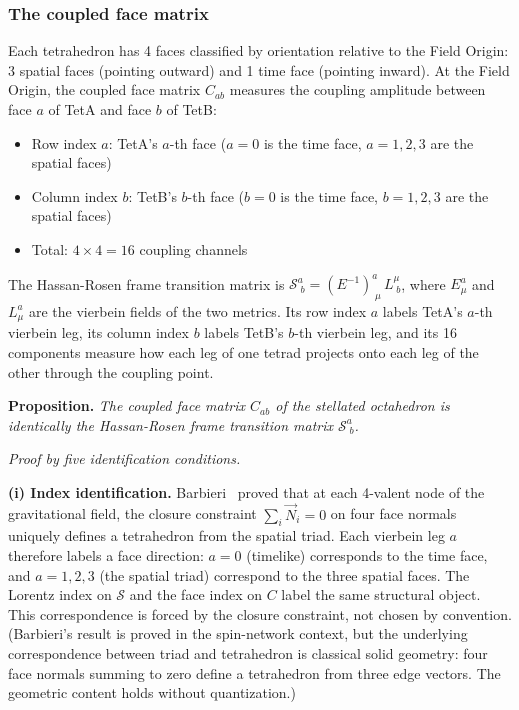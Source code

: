\documentclass[aps,prd,preprint,superscriptaddress,showpacs,preprintnumbers,amsmath,amssymb,nofootinbib]{revtex4-2}
\begin{document}
\subsubsection*{The coupled face matrix}

Each tetrahedron has 4 faces classified by orientation relative to the Field Origin: 3 spatial faces (pointing outward) and 1 time face (pointing inward). At the Field Origin, the coupled face matrix $C_{ab}$ measures the coupling amplitude between face $a$ of TetA and face $b$ of TetB:
\begin{itemize}
\item Row index $a$: TetA's $a$-th face ($a = 0$ is the time face, $a = 1,2,3$ are the spatial faces)
\item Column index $b$: TetB's $b$-th face ($b = 0$ is the time face, $b = 1,2,3$ are the spatial faces)
\item Total: $4 \times 4 = 16$ coupling channels
\end{itemize}

The Hassan-Rosen frame transition matrix is $\mathcal{S}^a_{\;b} = (E^{-1})^a_{\;\mu}\,L^\mu_{\;b}$, where $E^a_\mu$ and $L^a_\mu$ are the vierbein fields of the two metrics. Its row index $a$ labels TetA's $a$-th vierbein leg, its column index $b$ labels TetB's $b$-th vierbein leg, and its 16 components measure how each leg of one tetrad projects onto each leg of the other through the coupling point.

\vspace{0.5em}
\noindent\textbf{Proposition.} \textit{The coupled face matrix $C_{ab}$ of the stellated octahedron is identically the Hassan-Rosen frame transition matrix $\mathcal{S}^a_{\;b}$.}
\vspace{0.5em}

\noindent\textit{Proof by five identification conditions.}

\textbf{(i) Index identification.} Barbieri~\cite{barbieri1998} proved that at each 4-valent node of the gravitational field, the closure constraint $\sum_i \vec{N}_i = 0$ on four face normals uniquely defines a tetrahedron from the spatial triad. Each vierbein leg $a$ therefore labels a face direction: $a = 0$ (timelike) corresponds to the time face, and $a = 1,2,3$ (the spatial triad) correspond to the three spatial faces. The Lorentz index on $\mathcal{S}$ and the face index on $C$ label the same structural object. This correspondence is forced by the closure constraint, not chosen by convention. (Barbieri's result is proved in the spin-network context, but the underlying correspondence between triad and tetrahedron is classical solid geometry: four face normals summing to zero define a tetrahedron from three edge vectors. The geometric content holds without quantization.)
\end{document}
